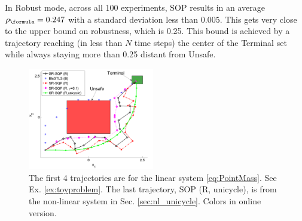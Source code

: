 \begin{exmp}
In Robust mode, across all 100 experiments, SOP results in an average $\rob_{\formula}=0.247$ with a standard deviation less than $0.005$. 
This gets very close to the upper bound on robustness, which is 0.25.
This bound is achieved by a trajectory reaching (in less than $N$ time steps) the center of the Terminal set while always staying more than 0.25 distant from Unsafe. 
\end{exmp}

\begin{figure}[t]
\centering
\includegraphics[width=0.49\textwidth]{figures/ToyExUni_alternate_scissored.pdf}
\vspace{-20pt}
\caption{{\small The first 4 trajectories are for the linear system \eqref{eq:PointMass}. See Ex. \ref{ex:toyproblem}. The last trajectory, SOP (R, unicycle), is from the non-linear system in Sec. \ref{sec:nl_unicycle}. Colors in online version.}}
\label{fig:toy control}
\vspace{-10pt}
\end{figure}

